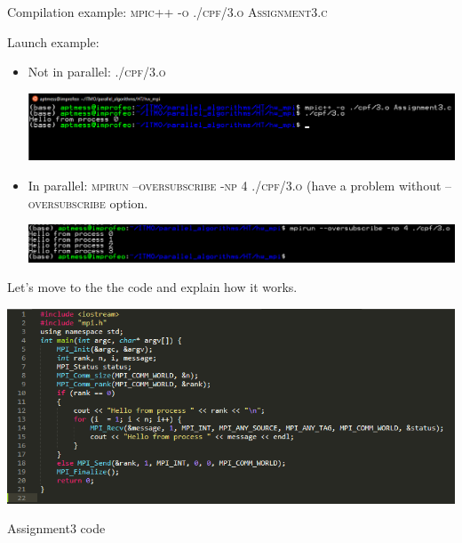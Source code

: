 \documentclass[%
12pt, %
final, %
oneside, %
onecolumn, %
centertags]{article} %
\theoremstyle{plain}
\theoremstyle{definition}
\theoremstyle{remark}
\begin{document}
Compilation example: \textsc{mpic++ -o ./cpf/3.o Assignment3.c}

Launch example:

\begin{itemize}
	\item Not in parallel: \textsc{./cpf/3.o}

	\begin{center}
		\includegraphics[scale=0.5]{3.1.png}
	\end{center}


	\item In parallel: \textsc{mpirun --oversubscribe -np 4 ./cpf/3.o} (have a problem without \textsc{--oversubscribe} option.

	\begin{center}
		\includegraphics[scale=0.5]{3.2.png}
	\end{center}

\end{itemize}

Let's move to the the code and explain how it works.

\begin{center}
		\includegraphics[scale=0.75]{3.code.png}

		Assignment3 code
\end{center}
\end{document}
